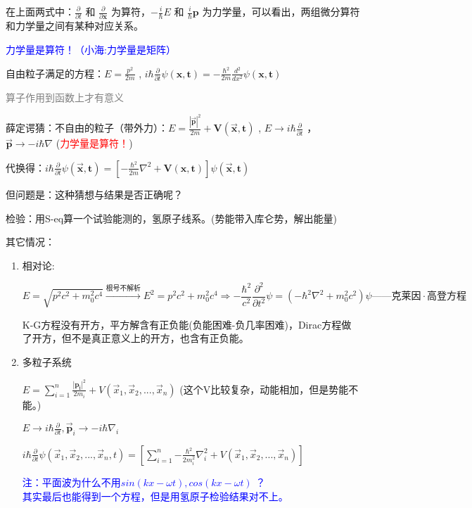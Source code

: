 在上面两式中：$\frac{\partial}{\partial t}$ 和 $\frac{\partial}{\partial \boldsymbol{x}}$ 为算符，$-\frac{i}{\hbar}E$ 和 $\frac{i}{\hbar}\boldsymbol{p}$ 为力学量，可以看出，两组微分算符和力学量之间有某种对应关系。

\textcolor{blue}{力学量是算符！（小海:力学量是矩阵）}

自由粒子满足的方程：$E=\frac{p^2}{2m}$ , $i\hbar \frac{\partial}{\partial t}\psi \left( \boldsymbol{x,t} \right) =-\frac{\hbar ^2}{2m}\frac{d^2}{dx^2}\psi \left( \boldsymbol{x,t} \right) $

\textcolor{gray}{算子作用到函数上才有意义}

薛定谔猜：不自由的粒子（带外力）：$E=\frac{\left| \boldsymbol{\vec{p}} \right|^2}{2m}+\boldsymbol{V}\left( \boldsymbol{\vec{x},t} \right) $ , $E\rightarrow i\hbar \frac{\partial}{\partial t}$ ， $\boldsymbol{\vec{p}}\rightarrow -i\hbar \nabla $ (\textcolor{red}{力学量是算符！})

代换得：$i\hbar \frac{\partial}{\partial t}\psi \left( \boldsymbol{\vec{x},t} \right) =\left[ -\frac{\hbar ^2}{2m}\nabla ^2+\boldsymbol{V}\left( \boldsymbol{x,t} \right) \right] \psi \left( \boldsymbol{\vec{x},t} \right) $

但问题是：这种猜想与结果是否正确呢？

检验：用S-eq算一个试验能测的，氢原子线系。(势能带入库仑势，解出能量)

其它情况：
\begin{enumerate}
\item 相对论:

$$E=\sqrt{p^2c^2+m_0^2c^4} \xrightarrow{\text{根号不解析}} E^2=p^2c^2+m_0^2c^4 \Longrightarrow -\frac{\hbar ^2}{c^2}\frac{\partial ^2}{\partial t^2}\psi =\left( -\hbar ^2\nabla ^2+m_0^2c^2 \right)\psi \text{——克莱因}·\text{高登方程}$$

K-G方程没有开方，平方解含有正负能(负能困难-负几率困难)，Dirac方程做了开方，但不是真正意义上的开方，也含有正负能。
\item 多粒子系统

$E=\sum_{i=1}^n{\frac{\left| \boldsymbol{p}_{\boldsymbol{i}} \right|^2}{2m_i}}+V\left( \vec{x}_1,\vec{x}_2,...,\vec{x}_n \right) $ (这个V比较复杂，动能相加，但是势能不能。)

$E\rightarrow i\hbar \frac{\partial}{\partial t},\boldsymbol{\vec{p}}_i\rightarrow -i\hbar \nabla _i$

$i\hbar \frac{\partial}{\partial t}\psi \left( \vec{x}_1,\vec{x}_2,...,\vec{x}_n,t \right) =\left[ \sum_{i=1}^n{-\frac{\hbar ^2}{2m_{i}^{2}}\nabla _{i}^{2}}+V\left( \vec{x}_1,\vec{x}_2,...,\vec{x}_n \right) \right] $

\textcolor{blue}{注：平面波为什么不用$sin(kx-\omega t),cos(kx-\omega t)$ ？\\ 其实最后也能得到一个方程，但是用氢原子检验结果对不上。}
\end{enumerate}




